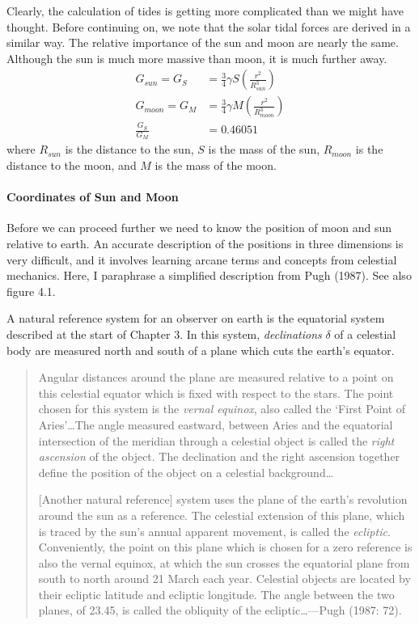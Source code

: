 Clearly, the calculation of tides is getting more complicated than we
might have thought. Before continuing on, we note that the solar tidal
forces are derived in a similar way. The relative importance of the
sun and moon are nearly the same.  Although the sun is much more
massive than moon, it is much further away.
\begin{align}
G_{sun}     = G_{S} &= \frac{3}{4} \gamma S \left( \frac{r^{2}}{R_{sun}^{3}} \right) \\
G_{moon}    = G_{M} &= \frac{3}{4} \gamma M \left( \frac{r^{2}}{R_{moon}^{3}} \right) \\
\frac{G_{S}}{G_{M}} &= 0.46051
\end{align}
where $R_{sun}$ is the distance to the sun, $S$ is the mass of the
sun, $R_{moon}$ is the distance to the moon, and $M$ is the mass of
the moon.

\paragraph{Coordinates of Sun and Moon}
Before we can proceed
further we need to know the position of moon and sun relative to
earth. An accurate description of the positions in three dimensions is
very difficult, and it involves learning arcane terms and concepts
from celestial mechanics. Here, I paraphrase a simplified description
from Pugh (1987). See also figure 4.1.

A natural reference system for an observer on earth is the equatorial
system described at the start of Chapter 3. In this system,
\textit{declinations} $\delta$ of a
celestial body are measured north and south of a plane which cuts the
earth's equator.
\begin{quotation} \small
Angular distances around the plane are measured relative to a point on
this celestial equator which is fixed with respect to the stars. The
point chosen for this system is the \textit{vernal equinox}, also
called the `First Point of Aries'\dots The angle measured eastward,
between Aries and the equatorial intersection of the meridian through
a celestial object is called the \textit{right ascension} of the
object. The declination and the right ascension together define the
position of the object on a celestial background\dots

[Another natural reference] system uses the plane of the earth's
revolution around the sun as a reference. The celestial extension of
this plane, which is traced by the sun's annual apparent movement, is
called the \textit{ecliptic}. Conveniently, the point on this plane
which is chosen for a zero reference is also the vernal equinox, at
which the sun crosses the equatorial plane from south to north around
21 March each year. Celestial objects are located by their ecliptic
latitude and ecliptic longitude. The angle between the two planes, of
23.45\degrees, is called the obliquity of the ecliptic\dots ---Pugh
(1987: 72).
\end{quotation}

